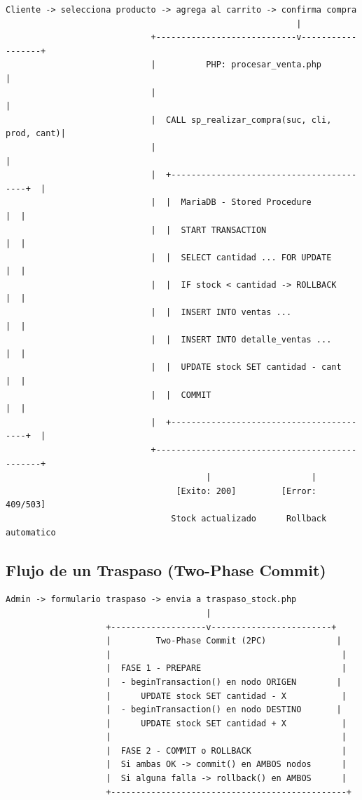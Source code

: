 \documentclass[11pt,a4paper]{article}
\begin{document}
\begin{lstlisting}
Cliente -> selecciona producto -> agrega al carrito -> confirma compra
                                                          |
                             +----------------------------v------------------+
                             |          PHP: procesar_venta.php              |
                             |                                               |
                             |  CALL sp_realizar_compra(suc, cli, prod, cant)|
                             |                                               |
                             |  +-----------------------------------------+  |
                             |  |  MariaDB - Stored Procedure             |  |
                             |  |  START TRANSACTION                      |  |
                             |  |  SELECT cantidad ... FOR UPDATE         |  |
                             |  |  IF stock < cantidad -> ROLLBACK        |  |
                             |  |  INSERT INTO ventas ...                 |  |
                             |  |  INSERT INTO detalle_ventas ...         |  |
                             |  |  UPDATE stock SET cantidad - cant       |  |
                             |  |  COMMIT                                 |  |
                             |  +-----------------------------------------+  |
                             +-----------------------------------------------+
                                        |                    |
                                  [Exito: 200]         [Error: 409/503]
                                 Stock actualizado      Rollback automatico
\end{lstlisting}

\subsection{Flujo de un Traspaso (Two-Phase Commit)}

\begin{lstlisting}
Admin -> formulario traspaso -> envia a traspaso_stock.php
                                        |
                    +-------------------v------------------------+
                    |         Two-Phase Commit (2PC)              |
                    |                                              |
                    |  FASE 1 - PREPARE                            |
                    |  - beginTransaction() en nodo ORIGEN        |
                    |      UPDATE stock SET cantidad - X           |
                    |  - beginTransaction() en nodo DESTINO       |
                    |      UPDATE stock SET cantidad + X           |
                    |                                              |
                    |  FASE 2 - COMMIT o ROLLBACK                  |
                    |  Si ambas OK -> commit() en AMBOS nodos      |
                    |  Si alguna falla -> rollback() en AMBOS      |
                    +-----------------------------------------------+
\end{lstlisting}
\end{document}
